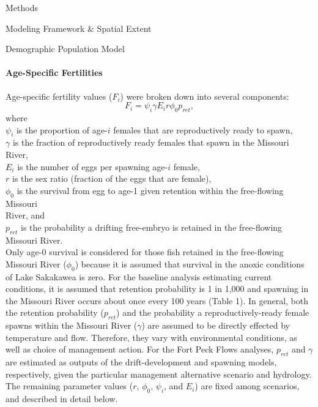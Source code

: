 \documentclass[12pt]{article}
\begin{document}
\begin{section}{Methods}
\begin{subsection}{Modeling Framework \& Spatial Extent}
\begin{subsubsection}{Demographic Population Model}
\paragraph{Age-Specific Fertilities}
Age-specific fertility values ($F_i$) were broken down into several components:
\begin{equation}
F_i=\psi_i\gamma E_ir\phi_{0}p_{ret},
\end{equation}
where\\
\hspace*{0.5cm}$\psi_i$ is the proportion of age-$i$ females that are reproductively ready to spawn,\\
\hspace*{0.5cm}$\gamma$ is the fraction of reproductively ready females that spawn in the Missouri River,\\
\hspace*{0.5cm}$E_i$ is the number of eggs per spawning age-$i$ female,\\ 
\hspace*{0.5cm}$r$ is the sex ratio (fraction of the eggs that are female),\\
\hspace*{0.5cm}$\phi_{0}$ is the survival from egg to age-1 given retention within the free-flowing Missouri\\
\hspace*{1.5cm}River, and\\
\hspace*{0.5cm}$p_{ret}$ is the probability a drifting free-embryo is retained in the free-flowing Missouri River.\\

Only age-0 survival is considered for those fish retained in the free-flowing Missouri River ($\phi_{0}$) because it is assumed that survival in the anoxic conditions of Lake Sakakawea is zero.   For the baseline analysis estimating current conditions, it is assumed that retention probability is 1 in 1,000 and spawning in the Missouri River occurs about once every 100 years (Table 1).   In general, both the retention probability ($p_{ret}$) and the probability a reproductively-ready female spawns within the Missouri River ($\gamma$) are assumed to be directly effected by temperature and flow.  Therefore, they vary with environmental conditions, as well as choice of management action.   For the Fort Peck Flows analyses, $p_{ret}$ and $\gamma$ are estimated as outputs of the drift-development and spawning models, respectively, given the particular management alternative scenario and hydrology.  The remaining parameter values ($r$, $\phi_0$, $\psi_i$, and $E_i$) are fixed among scenarios, and described in detail below.\\ 


\end{subsubsection}
\end{subsection}
\end{section}
\end{document}
